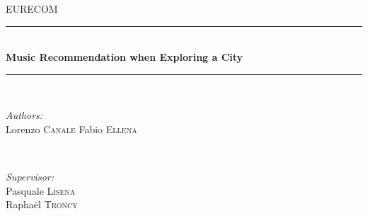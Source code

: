 \documentclass[paper=a4, fontsize=11pt]{scrartcl}
\begin{document}
\begin{titlepage}

\newcommand{\HRule}{\rule{\linewidth}{0.5mm}} %

\center %


\textsc{\LARGE EURECOM}\\[1.5cm] %


\HRule \\[0.4cm]
{ \huge \bfseries Music Recommendation when Exploring a City}\\[0.4cm] %
\HRule \\[1.5cm]


\begin{minipage}{0.4\textwidth}
\begin{flushleft} \large
\emph{Authors:}\\
Lorenzo \textsc{Canale} %
\newline
Fabio \textsc{Ellena} %
\end{flushleft}
\end{minipage}
~
\begin{minipage}{0.4\textwidth}
\begin{flushright} \large
\emph{Supervisor:} \\
Pasquale \textsc{Lisena} \\ %
Raphaël  \textsc{Troncy} %
\end{flushright}
\end{minipage}\\[2cm]


\end{titlepage}
\end{document}
